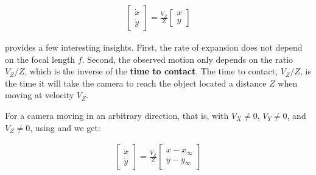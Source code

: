 \begin{align}
\begin{bmatrix}
\dot{x} \\
\dot{y}
\end{bmatrix}
= 
\frac{V_Z}{Z}
\begin{bmatrix}
x \\
y  
\end{bmatrix}
\label{eq:motion_projection_focus_expansion}
\end{align}



\Eqn{\ref{eq:motion_projection_focus_expansion}} provides a few interesting insights. First, the rate of expansion does not depend on the focal length $f$. Second, the observed motion only depends on the ratio $V_Z/Z$, which is the inverse of the {\bf time to contact}.
The time to contact, $V_Z/Z$, is the time it will take the camera to reach the object located a distance $Z$ when moving at velocity $V_Z$. 


For a camera moving in an arbitrary direction, that is, with $V_X \neq 0$, $V_Y \neq 0$, and $V_Z \neq 0$,  using \eqn{\ref{eq:motionprojection}} and \eqn{\ref{eq:motionvanishingpoint}} we get:


\begin{align}
\begin{bmatrix}
\dot{x} \\
\dot{y}
\end{bmatrix}
=
\frac{V_Z}{Z}
\begin{bmatrix}
x - x_{\infty}\\
y - y_{\infty} 
\end{bmatrix}
\end{align}


